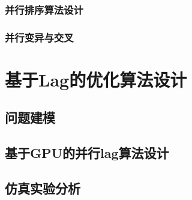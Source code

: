 \subsubsection{并行排序算法设计}
\subsubsection{并行变异与交叉}

\section{基于Lag的优化算法设计}
\subsection{问题建模}
\subsection{基于GPU的并行lag算法设计}
\subsection{仿真实验分析}
